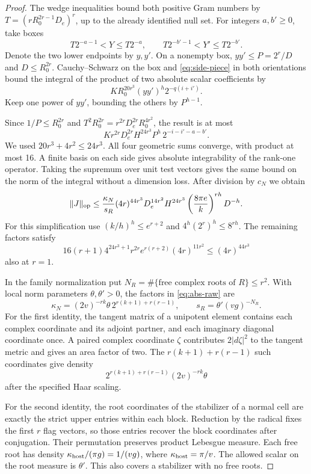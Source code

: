 \begin{proof}
The wedge inequalities bound both positive Gram numbers by
\(T=(rR_0^{2r-1}D_e)^r\), up to the already identified null set.
For integers \(a,b'\ge0\), take boxes
\[
   T2^{-a-1}<Y\le T2^{-a},\qquad T2^{-b'-1}<Y'\le T2^{-b'} .
\]
Denote the two lower endpoints by \(y,y'\). On a nonempty box,
\(yy'\le P=2^r/D\) and \(D\le R_0^{2r}\). Cauchy--Schwarz
on the box and \eqref{eq:side-piece} in both orientations bound
the integral of the product of two absolute scalar coefficients by
\[
 K R_0^{20r^3}(yy')^h2^{-q(i+i')}.
\]
Keep one power of \(yy'\), bounding the others by \(P^{h-1}\).

Since \(1/P\le R_0^{2r}\) and
\(T^2R_0^{2r}=r^{2r}D_e^{2r}R_0^{4r^2}\), the result is at most
\[
 Kr^{2r}D_e^{2r} H^{24r^3}P^h\,
             2^{-i-i'-a-b'} .
\]
We used \(20r^3+4r^2\le24r^3\). All four geometric sums
converge, with product at most 16. A finite basis on each
side gives absolute integrability of the rank-one operator. Taking the supremum over unit test vectors gives the same
bound on the norm of the integral without a dimension loss.
After division by \(c_N\) we obtain
\begin{equation}\label{eq:abs-raw}
 \|J\|_{\rm op}\le \frac{\kappa_N}{s_R}
 (4r)^{44r^3}D_e^{14r^2}H^{24r^3}
        \left(\frac{8\pi e}{k}\right)^{rh}D^{-h}.
\end{equation}
For this simplification use \((k/h)^h\le e^{r+2}\) and
\(4^h(2^r)^h\le8^{rh}\). The remaining factors satisfy
\[
 16(r+1)4^{24r^3+1}r^{2r}e^{r(r+2)}(4r)^{11r^2}
   \le (4r)^{44r^3}
\]
also at \(r=1\).


In the family normalization put \(N_R=\#\{\text{free complex
roots of }R\}\le r^2\). With local norm parameters
\(\theta,\theta'>0\), the factors in \eqref{eq:abs-raw} are
\begin{equation}\label{eq:absolute-root-scales}
 \kappa_N=(2v)^{-rk}\theta\,2^{r(k+1)+r(r-1)},\qquad
 s_R=\theta'(vg)^{-N_R}.
\end{equation}
For the first identity, the tangent matrix of a unipotent element
contains each complex coordinate and its adjoint partner, and
each imaginary diagonal coordinate once. A paired complex coordinate \(\zeta\) contributes \(2|d\zeta|^2\)
to the tangent metric and gives an area factor of two. The
\(r(k+1)+r(r-1)\) such coordinates give density
\[
        2^{r(k+1)+r(r-1)}(2v)^{-rk}\theta
\]
after the specified Haar scaling.

For the second identity, the root
coordinates of the stabilizer of a normal cell are exactly the
strict upper entries within each block. Reduction by the radical
fixes the first \(r\) flag vectors, so those entries recover the
block coordinates after conjugation. Their permutation preserves
product Lebesgue measure. Each free root has density
\(\kappa_{\rm host}/(\pi g)=1/(vg)\), where
\(\kappa_{\rm host}=\pi/v\). The allowed scalar on the root
measure is \(\theta'\). This also covers a stabilizer with no
free roots.


\end{proof}
